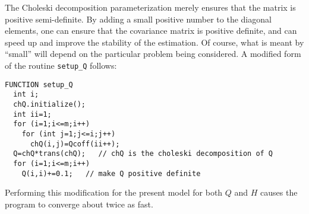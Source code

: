 The Choleski decomposition parameterization merely ensures that the 
matrix is positive semi-definite. By adding a small positive number to the
diagonal elements, one can ensure that the covariance matrix is
positive definite, and can speed up and improve the stability of the
estimation. Of course, what is meant by ``small'' will depend on the
particular problem being considered. 
A modified form of the routine \texttt{setup\_Q}
follows:
\begin{lstlisting}
FUNCTION setup_Q
  int i;
  chQ.initialize();
  int ii=1;
  for (i=1;i<=m;i++)
    for (int j=1;j<=i;j++)
      chQ(i,j)=Qcoff(ii++);
  Q=chQ*trans(chQ);   // chQ is the choleski decomposition of Q 
  for (i=1;i<=m;i++)
    Q(i,i)+=0.1;   // make Q positive definite
\end{lstlisting}
Performing this modification for the present model for both $Q$ and
$H$ causes the program to converge about twice as fast.

